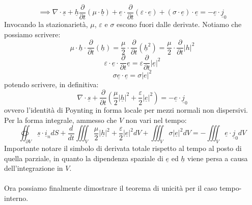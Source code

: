 \documentclass{book}
\begin{document}
        \begin{equation}
            \implies \nabla \cdot \underline{s} + \underline{h} \frac{\partial}{\partial t}(\mu \cdot \underline{b})+\underline{e} \cdot \frac{\partial}{\partial t}(\varepsilon \cdot \underline{e})+(\sigma \cdot \underline{e}) \cdot \underline{e} = -\underline{e} \cdot \underline{j}_{0}
        \end{equation}
        Invocando la stazionarietà, $\mu$, $\varepsilon$ e $\sigma$ escono fuori dalle derivate. Notiamo che possiamo scrivere:
        \begin{equation}
           \mu \cdot \underline{h} \cdot \frac{\partial}{\partial t} (\underline{h}) = \frac{\mu}{2} \cdot \frac{\partial}{\partial t} (\underline{h}^{2}) = \frac{\mu}{2} \cdot \frac{\partial}{\partial t}|h|^{2}
        \end{equation}
        \begin{equation}
            \varepsilon \cdot \underline{e} \cdot \frac{\partial}{\partial t} \underline{e} = \varepsilon \frac{\partial}{\partial t} |\underline{e}|^{2}
        \end{equation}
        \begin{equation}
            \sigma \underline{e} \cdot \underline{e} = \sigma |e|^{2}
        \end{equation}
        potendo scrivere, in definitiva:
        \begin{equation}
            \nabla \cdot \underline{s} + \frac{\partial}{\partial t}(\frac{\mu}{2} |\underline{h}|^{2}+\frac{\varepsilon}{2}|\underline{e}|^{2}) = - \underline{e} \cdot \underline{j}_{0}
        \end{equation}
        ovvero l'identità di Poynting in forma locale per mezzi normali non dispersivi.
        Per la forma integrale, ammesso che $V$ non vari nel tempo:
        \begin{equation}
            \oiint_{\partial V} \underline{s} \cdot \underline{i}_{n} dS + \frac{d}{dt}\iiint_{V} \frac{\mu}{2} |\underline{h}|^{2}+\frac{\varepsilon}{2}|\underline{e}|^{2}dV + \iiint_{V} \sigma |\underline{e}|^{2} dV = - \iiint_{V} \underline{e}\cdot \underline{j}_{0}dV
        \end{equation}
        Importante notare il simbolo di derivata totale rispetto al tempo al posto di quella parziale, in quanto la dipendenza spaziale di $\underline{e}$ ed $\underline{h}$ viene persa a causa dell'integrazione in $V$. \\ \\
        Ora possiamo finalmente dimostrare il teorema di unicità per il caso tempo-interno. 
\end{document}
